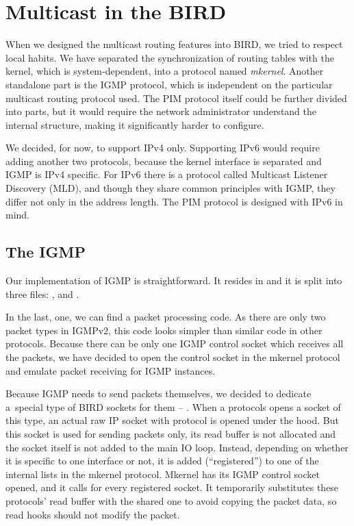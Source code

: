 \chapter{Multicast in the BIRD}

When we designed the multicast routing features into BIRD, we tried to respect
local habits. We have separated the synchronization of routing tables with the
kernel, which is system-dependent, into a protocol named \emph{mkernel}.
Another standalone part is the IGMP protocol, which is independent on the
particular multicast routing protocol used. The PIM protocol itself could be
further divided into parts, but it would require the network administrator
understand the internal structure, making it significantly harder to configure.

We decided, for now, to support IPv4 only. Supporting IPv6 would require adding
another two protocols, because the kernel interface is separated and IGMP is
IPv4 specific. For IPv6 there is a protocol called Multicast Listener Discovery
(MLD), and though they share common principles with IGMP, they differ not only
in the address length. The PIM protocol is designed with IPv6 in mind.

\section{The IGMP}

Our implementation of IGMP is straightforward. It resides in
 and it is split into three files: ,
 and .

In the last, one, we can find a packet processing code. As there are only two
packet types in IGMPv2, this code looks simpler than similar code in other
protocols. Because there can be only one IGMP control socket which receives all
the packets, we have decided to open the control socket in the mkernel protocol
and emulate packet receiving for IGMP instances.

Because IGMP needs to send packets themselves, we decided to dedicate a~special
type of BIRD sockets for them -- . When a protocols opens
a socket of this type, an actual raw IP socket with protocol
 is opened under the hood. But this socket is used for
sending packets only, its read buffer is not allocated and the socket itself is
not added to the main IO loop. Instead, depending on whether it is specific to
one interface or not, it is added (``registered'') to one of the internal lists
in the mkernel protocol. Mkernel has its IGMP control socket opened, and it calls
 for every registered socket. It temporarily substitutes these
protocols' read buffer with the shared one to avoid copying the packet data, so
read hooks should not modify the packet.

